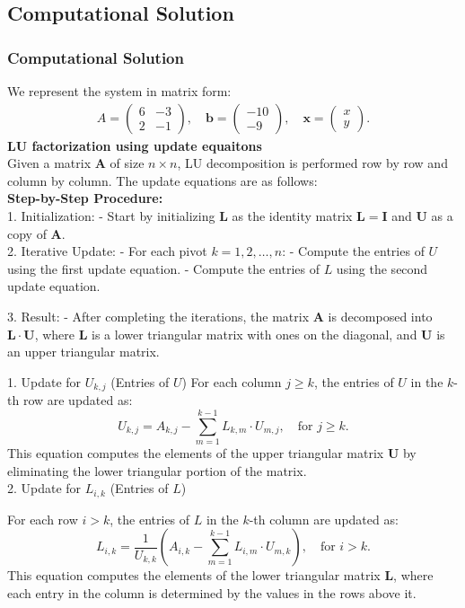 \documentclass{beamer}
\theoremstyle{remark}
\newcommand{\myvec}[1]{\ensuremath{\begin{pmatrix}#1\end{pmatrix}}}
\let\vec\mathbf
\numberwithin{equation}{section}
\begin{document}
\subsection{Computational Solution}
\begin{frame}
\frametitle{Computational Solution}
We represent the system in matrix form:
\begin{align}
A = \myvec{6& -3 \\ 2 & -1}, \quad
\vec{b} = \myvec{-10 \\ -9}, \quad
\vec{x} = \myvec{x \\ y}.
\end{align}
\textbf{LU factorization using update equaitons} \\ 
    Given a matrix $ \mathbf{A} $ of size $ n \times n $, LU decomposition is performed row by row and column by column. The update equations are as follows:\\
    \textbf{Step-by-Step Procedure:}\\
    1. Initialization: 
   - Start by initializing $ \mathbf{L} $ as the identity matrix $ \mathbf{L} = \mathbf{I} $ and $ \mathbf{U} $ as a copy of $ \mathbf{A} $. \\
   2. Iterative Update:
   - For each pivot $ k = 1, 2, \ldots, n $:
     - Compute the entries of $ U $ using the first update equation.
     - Compute the entries of $ L $ using the second update equation.
\end{frame}
\begin{frame}
3. Result:
   - After completing the iterations, the matrix $ \mathbf{A} $ is decomposed into $ \mathbf{L} \cdot \mathbf{U} $, where $ \mathbf{L} $ is a lower triangular matrix with ones on the diagonal, and $ \mathbf{U} $ is an upper triangular matrix.\\

\end{frame}
\begin{frame}
   1. Update for $ U_{k,j} $ (Entries of $ U $)
For each column $ j \geq k $, the entries of $ U $ in the $ k $-th row are updated as:
\[
U_{k,j} = A_{k,j} - \sum_{m=1}^{k-1} L_{k,m} \cdot U_{m,j}, \quad \text{for } j \geq k.
\]
This equation computes the elements of the upper triangular matrix $ \mathbf{U} $ by eliminating the lower triangular portion of the matrix.\\
2. Update for $ L_{i,k} $ (Entries of $ L $)

For each row $ i > k $, the entries of $ L $ in the $ k $-th column are updated as:
\[
L_{i,k} = \frac{1}{U_{k,k}} \left( A_{i,k} - \sum_{m=1}^{k-1} L_{i,m} \cdot U_{m,k} \right), \quad \text{for } i > k.
\]
This equation computes the elements of the lower triangular matrix $ \mathbf{L} $, where each entry in the column is determined by the values in the rows above it.\\
\end{frame}
\end{document}

